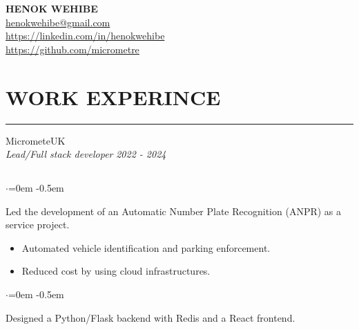 \documentclass{article}
\begin{document}
\begin{center}
\textbf{\huge HENOK WEHIBE} \\
\vspace{1.5em}
\href{mailto:henokwehibe@gmail.com}{henokwehibe@gmail.com} \\
\vspace{1.0em}
\href{https://linkedin.com/in/henokwehibe}{https://linkedin.com/in/henokwehibe}\\
\vspace{1.0em}
\href{https://github.com/micrometre}{https://github.com/micrometre }\\
\end{center}


\section* {WORK EXPERINCE}
\vspace{-0.6em}
\hrule 
\vspace{0.4em}
{\bf}{} MicrometeUK \hfill {} \\%
{\em Lead/Full stack developer} \hfill {\em 2022 - 2024 } %
\subsection*{}
\vspace{-2.6em}
\begin{list}{$\cdot$}{\leftmargin=0em} %
    \itemsep -0.5em \vspace{-0.5em} %
    \item Led the development of an Automatic Number Plate Recognition (ANPR) as a service project.
\end{list}
\vspace{-1.6em}
\begin{itemize}
    \item Automated vehicle identification and parking enforcement. 
    \item Reduced cost by using cloud infrastructures. 
\end{itemize}
\begin{list}{$\cdot$}{\leftmargin=0em} %
    \itemsep -0.5em \vspace{-0.5em} %
    \item Designed a Python/Flask backend with Redis and a React frontend. 
\end{list}
\end{document}
